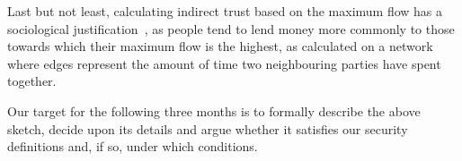   Last but not least, calculating indirect trust based on the maximum flow has a
  sociological justification~\cite{jgs}, as people tend to lend money more commonly to
  those towards which their maximum flow is the highest, as calculated on a network where
  edges represent the amount of time two neighbouring parties have spent together.

  Our target for the following three months is to formally describe the above sketch,
  decide upon its details and argue whether it satisfies our security definitions and, if
  so, under which conditions.
